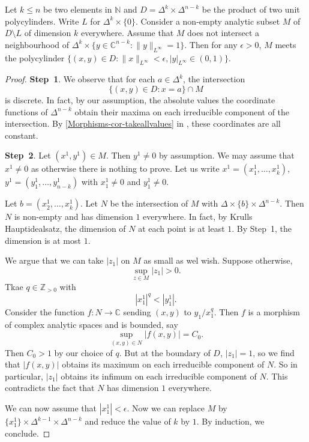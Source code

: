 \begin{lemma}\label{lma-intersectionpundprod}
    Let $k\leq n$ be two elements in $\mathbb{N}$ and $D=\Delta^{k}\times \Delta^{n-k}$ be the product of two unit polycylinders. Write $L$ for $\Delta^k\times \{0\}$. Consider a non-empty analytic subset $M$ of $D\setminus L$ of dimension $k$ everywhere. Assume that $M$ does not intersect a neighbourhood of $\Delta^k\times\{y\in \mathbb{C}^{n-k}: \|y\|_{L^{\infty}}=1\}$. Then for any $\epsilon>0$, $M$ meets the polycylinder $\{(x,y)\in D:\|x\|_{L^{\infty}}<\epsilon, |y|_{L^{\infty}}\in (0,1)\}$.
\end{lemma}
\begin{proof}
    \textbf{Step~1}. We observe that for each $a\in \Delta^k$, the intersection
    \[
        \{(x,y)\in D:x=a\}\cap M  
    \]
    is discrete. In fact, by our assumption, the absolute values the coordinate functions of $\Delta^{n-k}$ obtain their maxima on each irreducible component of the intersection. By \cref{Morphisms-cor-takeallvalues}  in , these coordinates are all constant.

    \textbf{Step~2}. Let $(x^1,y^1)\in M$. Then $y^1\neq 0$ by assumption. We may assume that $x^1\neq 0$ as otherwise there is nothing to prove. Let us write $x^1=(x^1_1,\ldots,x^1_k)$, $y^1=(y^1_1,\ldots,y^1_{n-k})$ with $x^1_1\neq 0$ and $y^1_1\neq 0$.

    Let $b=(x^1_2,\ldots,x^1_k)$. Let $N$ be the intersection of $M$ with $\Delta\times \{b\}\times \Delta^{n-k}$. Then $N$ is non-empty and has dimension $1$ everywhere. In fact, by Krulls Hauptidealsatz, the dimension of $N$ at each point is at least $1$. By Step~1, the dimension is at most $1$.

    We argue that we can take $|z_1|$ on $M$ as small as wel wish. Suppose otherwise,
    \[
        \sup_{z\in M}|z_1|>0.
    \]
    Tkae $q\in \mathbb{Z}_{>0}$ with
    \[
        |x_1^1|^q<|y_1^1|.    
    \]
    Consider the function $f:N\rightarrow \mathbb{C}$ sending $(x,y)$ to $y_1/x_1^q$. Then $f$ is a morphism of complex analytic spaces and is bounded, say
    \[
        \sup_{(x,y)\in  N}|f(x,y)|=C_0.  
    \]
    Then $C_0>1$ by our choice of $q$. But at the boundary of $D$, $|z_1|=1$, so we find that $|f(x,y)|$ obtains its maximum on each irreducible component of $N$. So in particular, $|z_1|$ obtains its infimum on each irreducible component of $N$. This contradicts the fact that $N$ has dimension $1$ everywhere.

    We can now assume that $|x_1^1|<\epsilon$.
    Now we can replace $M$ by $\{x_1^1\}\times \Delta^{k-1}\times \Delta^{n-k}$ and reduce the value of $k$ by $1$. By induction, we conclude.
\end{proof}


